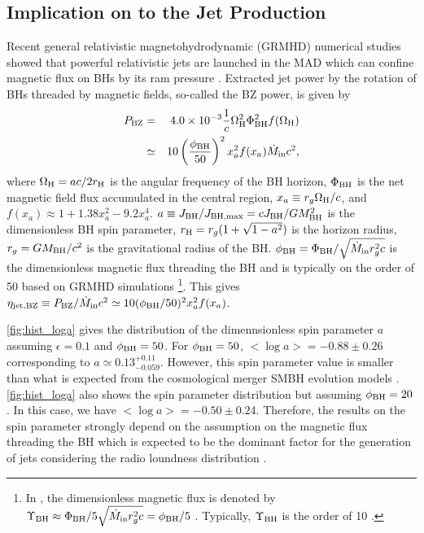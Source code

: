 \documentclass[preprint2,twocolappendix]{aastex6}
\begin{document}
\subsection{Implication on to the Jet Production}
\label{subsec:impjet}

Recent general relativistic magnetohydrodynamic (GRMHD) numerical studies showed that powerful relativistic jets are launched in the MAD which can confine magnetic flux on BHs by its ram pressure \citep{tch11,mck12}. Extracted jet power by the rotation of BHs threaded by magnetic fields, so-called the BZ power, is given by \citep{bla77,tan08,tch10,tch11}
\begin{eqnarray}
P_{\rm BZ} &=& 4.0\times10^{-3}\frac{1}{c}\Omega_{\rm H}^2 \Phi_{\rm BH}^2f(\Omega_{\rm H})\\
&\simeq& 10 \left(\frac{\phi_{\rm BH}}{50}\right)^2x_a^2f(x_a)\dot{M}_{\rm in}c^2,
\end{eqnarray}
where $\Omega_{\rm H}=ac/2r_{\rm H}$ is the angular frequency of the BH horizon, $\Phi_{\rm BH}$ is the net magnetic field flux accumulated in the central region, $x_a\equiv r_g\Omega_{\rm H}/c$, and $f(x_a)\approx1+1.38x_a^2-9.2x_a^4$. $a\equiv J_{\rm BH}/J_{\rm BH, max}=cJ_{\rm BH}/GM_{\rm BH}^2$ is the dimensionless BH spin parameter, $r_{\rm H}=r_g(1+\sqrt{1-a^2})$ is the horizon radius, $r_g = GM_{\rm BH}/c^2$ is the gravitational radius of the BH. $\phi_{\rm BH}=\Phi_{\rm BH}/\sqrt{\dot{M}_{\rm in}r_g^2c}$ is the dimensionless magnetic flux threading the BH and is typically on the order of 50 based on GRMHD simulations \citep{mck12}\footnote{In \citet{mck12}, the dimensionless magnetic flux is denoted by $\Upsilon_{\rm BH}\approx \Phi_{\rm BH}/5\sqrt{\dot{M}_{\rm in}r_g^2c}=\phi_{\rm BH}/5$ \citep{gam99,pen10}. Typically, $\Upsilon_{\rm BH}$ is the order of 10 \citep[see Table 9 in][]{mck12}.}. This gives $\eta_{\rm jet, BZ}\equiv P_{\rm BZ}/\dot{M}_{\rm in}c^2 \simeq10 (\phi_{\rm BH}/50)^2x_a^2f(x_a)$. 

\autoref{fig:hist_loga} gives the distribution of the dimennsionless spin parameter $a$ assuming $\epsilon=0.1$ and $\phi_{\rm BH}=50$. For $\phi_{\rm BH}=50$, $<\log a>=-0.88\pm0.26$ corresponding to $a\simeq0.13_{-0.059}^{+0.11}$. However, this spin parameter value is smaller than what is expected from the cosmological merger SMBH evolution models  \citep{vol05,vol07,vol13}. \autoref{fig:hist_loga} also shows the spin parameter distribution but assuming $\phi_{\rm BH}=20$. In this case, we have $<\log a> = -0.50 \pm 0.24$. Therefore, the results on the spin parameter strongly depend on the assumption on the magnetic flux threading the BH which is expected to be the dominant factor for the generation of jets considering the radio loundness distribution \citep{sik13_rad}. 
\end{document}
